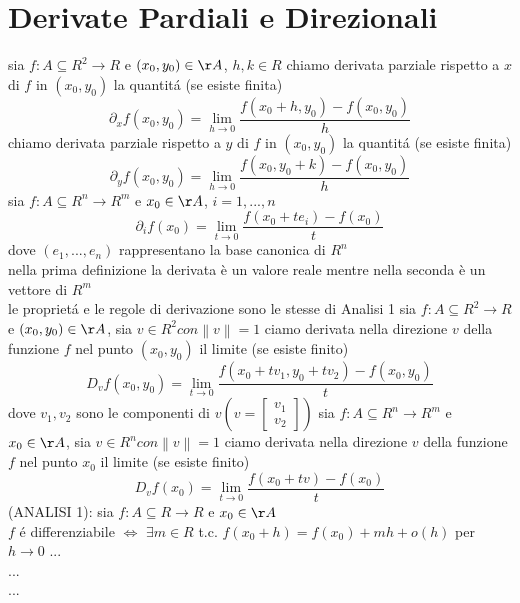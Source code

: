 \section{Derivate Pardiali e Direzionali}
sia $f:A\subseteq{R^2}\rightarrow{R}$ e $(x_0,y_0)\in\AA$, $h,k\in{R}$
chiamo derivata parziale rispetto a $x$ di $f$ in $(x_0,y_0)$ la quantit\'a (se esiste finita)
$$\partial_xf(x_0,y_0) = \lim\limits_{h\rightarrow{0}}\frac{f(x_0+h,y_0)-f(x_0,y_0)}{h}$$
chiamo derivata parziale rispetto a $y$ di $f$ in $(x_0,y_0)$ la quantit\'a (se esiste finita)
$$\partial_yf(x_0,y_0) = \lim\limits_{h\rightarrow{0}}\frac{f(x_0,y_0+k)-f(x_0,y_0)}{h}$$
sia $f:A\subseteq{R^n}\rightarrow{R^m}$ e $x_0\in\AA$, $i=1,...,n$
$$\partial_if(x_0) = \lim\limits_{t\rightarrow{0}}\frac{f(x_0+te_i)-f(x_0)}{t}$$
dove $(e_1,...,e_n)$ rappresentano la base canonica di $R^n$\\
\observation nella prima definizione la derivata è un valore reale mentre nella seconda è un vettore di $R^m$\\
\observation le propriet\'a e le regole di derivazione sono le stesse di Analisi 1
sia $f:A\subseteq{R^2}\rightarrow{R}$ e $(x_0,y_0)\in\AA$, sia $v\in{R^2} con \left\| v\right\|=1 $
ciamo derivata nella direzione $v$ della funzione $f$ nel punto $(x_0,y_0)$ il limite (se esiste finito)\\
$$D_vf(x_0,y_0) = \lim\limits_{t\rightarrow{0}}\frac{f(x_0+tv_1,y_0+tv_2)-f(x_0,y_0)}{t}$$
dove $v_1,v_2$ sono le componenti di $v(v=\begin{bmatrix}v_1\\v_2\end{bmatrix})$
sia $f:A\subseteq{R^n}\rightarrow{R^m}$ e $x_0\in\AA$, sia $v\in{R^n} con \left\| v\right\|=1 $
ciamo derivata nella direzione $v$ della funzione $f$ nel punto $x_0$ il limite (se esiste finito)\\
$$D_vf(x_0) = \lim\limits_{t\rightarrow{0}}\frac{f(x_0+tv)-f(x_0)}{t}$$
\proposition
(ANALISI 1): sia $f:A\subseteq R\rightarrow{R}$ e $x_0\in\AA$\\
$f$ \'e differenziabile $\Leftrightarrow$ $\exists m\in R $ t.c. $f(x_0+h)=f(x_0)+mh+o(h)$ per $h\rightarrow 0$
...\\
...\\
...\\

